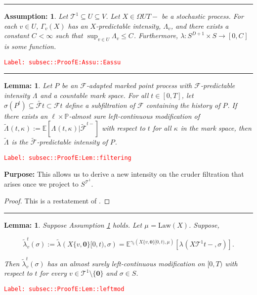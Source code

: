 \documentclass[12pt]{article}
\newcommand{\mb}{\mathbb}
\newcommand{\mc}{\mathcal}
\newcommand{\ra}{\rightarrow}
\newcommand{\te}{\text}
\newcommand{\tr}{\textcolor{red}}
\newcommand{\labe}[1]{\tr{\texttt{Label: #1}}}
\newcommand{\purpose}{\textbf{Purpose: }}
\newcommand{\lin}{\rule{\linewidth}{0.4 pt}}
\newcommand{\pr}{\mb{P}}							%
\newcommand{\ex}[1]{\mb{E}\left[#1\right]}			%
\newcommand{\exmu}[2]{\mb{E}^{#1}\left[#2\right]}	%
\renewcommand{\root}{\mathbf{0}}				%
\renewcommand{\v}{v}							%
\renewcommand{\U}{U}							%
\renewcommand{\S}{S}							%
\newcommand{\s}{\sigma}							%
\newcommand{\T}{T}								%
\renewcommand{\t}{t}							%
\newcommand{\F}{\mc{F}}							%
\newcommand{\X}{X}								%
\newcommand{\degr}{D}								%
\newcommand{\law}{\te{Law}}							%
\newcommand{\pup}[1]{^{#1}}							%
\newcommand{\tree}{\mc{T}}							%
\newcommand{\rp}[1]{P^{#1}}							%
\newcommand{\m}[3]{\mu_{#2#1}^{#3}}						%
\newcommand{\cm}{\gamma}							%
\newcommand{\rate}[1]{\lambda_{#1}}					%
\newcommand{\ratee}[1]{\Lambda_{#1}}				%
\newcommand{\crate}[2]{\alt{\lambda}_{#1}^{#2}}		%
\newcommand{\cratee}[2]{\alt{\Lambda}_{#1}^{#2}} 	%
\newcommand{\const}[1]{C_{#1}}						%
\newcommand{\Sm}{\ell}								%
\newcommand{\alt}{\widetilde}						%
\renewcommand{\mark}[1]{\kappa^{#1}}				%
\newcommand{\pmap}[1]{\Gamma_{#1}}				%
\newtheorem{lem}[thms]{Lemma: }
\newtheorem{assu}[thms]{Assumption: }
\begin{document}
\lin

\begin{assu}
Let \(\tree\pup{1}\subseteq\U \subseteq  V\). Let \(\X{}{}\in \Omega{\U}{\T-}\) be a stochastic process. For each \(\v\in \U\), \(\pmap{\v}(\X{}{})\) has an \(\X{}{}\)-predictable intensity, \(\ratee{\v}\), and there exists a constant \(\const{} < \infty\) such that \(\sup_{\v\in\U} \ratee{\v} \leq \const{}\). Furthermore, \(\lambda: \S^{\degr+1}\times \S\ra[0,\const{}]\) is some function.
\label{subsec::ProofE:Assu::Eassu}
\end{assu}
\labe{subsec::ProofE:Assu::Eassu}

\lin

\begin{lem}
Let \(\rp{}\) be an \(\F{}{}\)-adapted marked point process with \(\F{}{}\)-predictable intensity \(\ratee{}\) and a countable mark space. For all \(\t \in [0,\T]\), let \(\sigma(\rp{\t}) \subseteq \alt{\F{}{\t}}\subset \F{}{\t}\) define a subfiltration of \(\F{}{}\) containing the history of \(\rp{}\). If there exists an \(\Sm\times \pr\)-almost sure left-continuous modification of \(\cratee{}{}(\t,\mark{}) := \ex{\ratee{}(\t,\mark{})|\alt{\F{}{}}^{\t-}}\) with respect to \(\t\) for all \(\mark{}\) in the mark space, then \(\cratee{}{}\) is the \(\alt{\F{}{}}\)-predictable intensity of \(\rp{}\).
\label{subsec::ProofE:Lem::filtering}
\end{lem}
\labe{subsec::ProofE:Lem::filtering}

\purpose This allows us to derive a new intensity on the cruder filtration that arises once we project to \(\S^{\tree^1}\).

\begin{proof}
This is a restatement of \cite[Theorem 14.3.III]{DalVer08}.
\end{proof}

\lin

\begin{lem}
Suppose Assumption \ref{subsec::ProofE:Assu::Eassu} holds. Let \(\m{}{}{} = \law(\X{}{})\). Suppose,

\[\crate{\v}{\t}(\s) := \crate{}{}(\X{\{\v,\root\}}{[0,\t)},\s) = \exmu{\cm_\t(\X{\{\v,\root\}}{[0,\t)},\m{}{}{})}{\rate{}(\X{\tree\pup{1}}{\t-},\s)}.\]


Then \(\crate{\v}{\t}(\s)\) has an almost surely left-continuous modification on \([0,\T)\) with respect to \(\t\) for every \(\v \in \tree\pup{1}\setminus\{\root\}\) and \(\s \in \S\).
\label{subsec::ProofE:Lem::leftmod}
\end{lem}
\labe{subsec::ProofE:Lem::leftmod}
\end{document}
